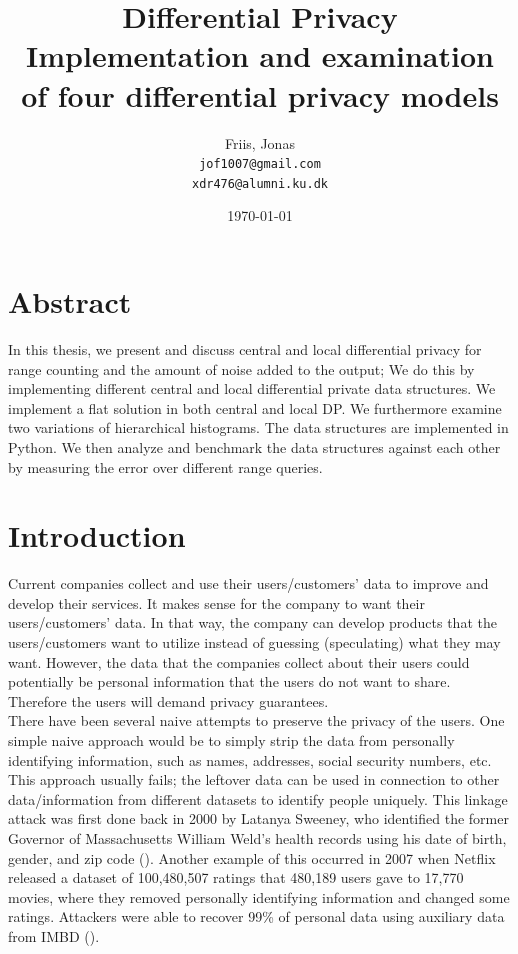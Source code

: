 \documentclass[11pt]{article}
\title{
  \vspace{3cm}
  \Huge{Differential Privacy} \\
  \Large{Implementation and examination of four differential privacy models}
}
\author{
  \Large{Friis, Jonas}
  \\ \texttt{jof1007@gmail.com} \\
\texttt{xdr476@alumni.ku.dk}
}
\date{
    \today
}
\theoremstyle{definition}
\def \ColourPDF {include/ku-farve}
\def \TitlePDF   {include/nat-en}  %
\begin{document}


\clearpage\maketitle
\thispagestyle{empty}

\newpage

\section{Abstract}
In this thesis, we present and discuss central and local differential privacy for range counting and the amount of noise added to the output; We do this by implementing different central and local differential private data structures. We implement a flat solution in both central and local DP. We furthermore examine two variations of hierarchical histograms. The data structures are implemented in Python. We then analyze and benchmark the data structures against each other by measuring the error over different range queries.


\newpage
\tableofcontents
\newpage
\section{Introduction}
Current companies collect and use their users/customers' data to improve and develop their services. It makes sense for the company to want their users/customers' data. In that way, the company can develop products that the users/customers want to utilize instead of guessing (speculating) what they may want. However, the data that the companies collect about their users could potentially be personal information that the users do not want to share. Therefore the users will demand privacy guarantees. \\

\noindent There have been several naive attempts to preserve the privacy of the users.  One simple naive approach would be to simply strip the data from personally identifying information, such as names, addresses, social security numbers, etc. This approach usually fails; the leftover data can be used in connection to other data/information from different datasets to identify people uniquely. This linkage attack was first done back in 2000 by Latanya Sweeney, who identified the former Governor of Massachusetts  William Weld's health records using his date of birth, gender, and zip code (\cite{Sweeney}). Another example of this occurred in 2007 when Netflix released a dataset of 100,480,507 ratings that 480,189 users gave to 17,770 movies, where they removed personally identifying information and changed some ratings. Attackers were able to recover 99\% of personal data using auxiliary data from IMBD (\cite{netflix}). \\
\end{document}
